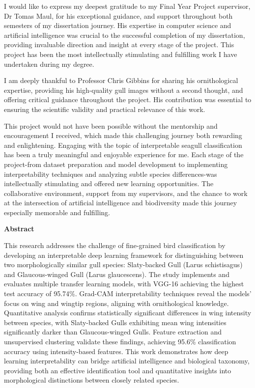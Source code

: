 \documentclass[a4paper,12pt]{report}
\begin{document}
I would like to express my deepest gratitude to my Final Year Project supervisor, Dr Tomas Maul, for his exceptional guidance, and support throughout both semesters of my dissertation journey. His expertise in computer science and artificial intelligence was crucial to the successful completion of my dissertation, providing invaluable direction and insight at every stage of the project. This project has been the most intellectually stimulating and fulfilling work I have undertaken during my degree. 

I am deeply thankful to Professor Chris Gibbins for sharing his ornithological expertise, providing his high-quality gull images without a second thought, and offering critical guidance throughout the project. His contribution was essential to ensuring the scientific validity and practical relevance of this work.

This project would not have been possible without the mentorship and encouragement I received, which made this challenging journey both rewarding and enlightening. Engaging with the topic of interpretable seagull classification has been a truly meaningful and enjoyable experience for me. Each stage of the project-from dataset preparation and model development to implementing interpretability techniques and analyzing subtle species differences-was intellectually stimulating and offered new learning opportunities. The collaborative environment, support from my supervisors, and the chance to work at the intersection of artificial intelligence and biodiversity made this journey especially memorable and fulfilling.

\newpage
\begin{center}
    \textbf{Abstract}
\end{center}

This research addresses the challenge of fine-grained bird classification by developing an interpretable deep learning framework for distinguishing between two morphologically similar gull species: Slaty-backed Gull (Larus schistisagus) and Glaucous-winged Gull (Larus glaucescens). The study implements and evaluates multiple transfer learning models, with VGG-16 achieving the highest test accuracy of 95.74\%. Grad-CAM interpretability techniques reveal the models' focus on wing and wingtip regions, aligning with ornithological knowledge. Quantitative analysis confirms statistically significant differences in wing intensity between species, with Slaty-backed Gulls exhibiting mean wing intensities significantly darker than Glaucous-winged Gulls. Feature extraction and unsupervised clustering validate these findings, achieving 95.6\% classification accuracy using intensity-based features. This work demonstrates how deep learning interpretability can bridge artificial intelligence and biological taxonomy, providing both an effective identification tool and quantitative insights into morphological distinctions between closely related species.
\end{document}
